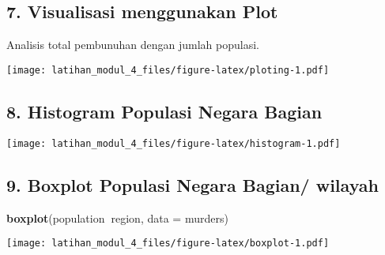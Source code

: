 \documentclass[
]{article}
\newenvironment{Shaded}{\begin{snugshade}}{\end{snugshade}}
\newcommand{\DataTypeTok}[1]{\textcolor[rgb]{0.13,0.29,0.53}{#1}}
\newcommand{\DecValTok}[1]{\textcolor[rgb]{0.00,0.00,0.81}{#1}}
\newcommand{\KeywordTok}[1]{\textcolor[rgb]{0.13,0.29,0.53}{\textbf{#1}}}
\newcommand{\NormalTok}[1]{#1}
\newcommand{\OperatorTok}[1]{\textcolor[rgb]{0.81,0.36,0.00}{\textbf{#1}}}
\newcommand{\StringTok}[1]{\textcolor[rgb]{0.31,0.60,0.02}{#1}}
\begin{document}
\newpage

\hypertarget{visualisasi-menggunakan-plot}{%
\subsection{7. Visualisasi menggunakan
Plot}\label{visualisasi-menggunakan-plot}}

Analisis total pembunuhan dengan jumlah populasi.

\begin{Shaded}
\end{Shaded}

\texttt{[image: latihan\_modul\_4\_files/figure-latex/ploting-1.pdf]}

\newpage

\hypertarget{histogram-populasi-negara-bagian}{%
\subsection{8. Histogram Populasi Negara
Bagian}\label{histogram-populasi-negara-bagian}}

\begin{Shaded}
\end{Shaded}

\texttt{[image: latihan\_modul\_4\_files/figure-latex/histogram-1.pdf]}

\newpage

\hypertarget{boxplot-populasi-negara-bagian-wilayah}{%
\subsection{9. Boxplot Populasi Negara Bagian/
wilayah}\label{boxplot-populasi-negara-bagian-wilayah}}

\begin{Shaded}
\begin{Highlighting}[]
\KeywordTok{boxplot}\NormalTok{(population}\OperatorTok{~}\NormalTok{region, }\DataTypeTok{data =}\NormalTok{ murders)}
\end{Highlighting}
\end{Shaded}

\texttt{[image: latihan\_modul\_4\_files/figure-latex/boxplot-1.pdf]}
\end{document}

